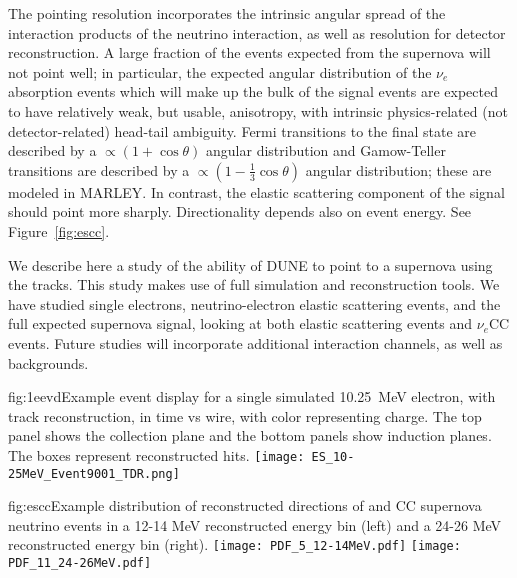 The pointing resolution incorporates the intrinsic angular spread of the
interaction products of the neutrino interaction, as well as
resolution for detector reconstruction.  A large fraction of the
events expected from the supernova will not point well; in particular,
the expected angular distribution of the $\nu_e$  absorption
events which will make up the bulk of the signal events are expected
to have relatively weak, but usable,  anisotropy, with intrinsic physics-related
(not detector-related)
head-tail ambiguity.   Fermi transitions to the final state are
described by a $\propto (1+\cos\theta)$ angular distribution and Gamow-Teller
transitions are
described by a $\propto (1-\frac{1}{3}\cos\theta)$ angular
distribution; these are modeled in MARLEY.
In contrast, the elastic
scattering component of the signal should point more sharply.
Directionality depends also on event energy.  See Figure~\ref{fig:escc}. 

We describe here a study of the ability of DUNE to point to a
supernova using the  tracks.  This study makes use of full
simulation and reconstruction tools.  We have studied single
electrons, neutrino-electron elastic scattering events, and the full
expected supernova signal, looking at both elastic scattering events
and $\nu_e$CC events.  Future studies will
incorporate additional interaction channels, as well as backgrounds.

\begin{dunefigure}{fig:1eevd}{Example event display for a
    single simulated 10.25~MeV electron, with track reconstruction, in
    time vs wire, with color representing charge.
    The top panel shows the collection plane and the bottom panels
    show induction planes.  The boxes represent reconstructed hits. }
 \texttt{[image: ES\_10-25MeV\_Event9001\_TDR.png]}
\end{dunefigure}


\begin{dunefigure}{fig:escc}{Example
   distribution of reconstructed directions of  and CC supernova neutrino
    events in a 12-14 MeV reconstructed energy bin (left) and a 24-26
    MeV reconstructed energy bin (right). }
 \texttt{[image: PDF\_5\_12-14MeV.pdf]}
 \texttt{[image: PDF\_11\_24-26MeV.pdf]}
\end{dunefigure}


